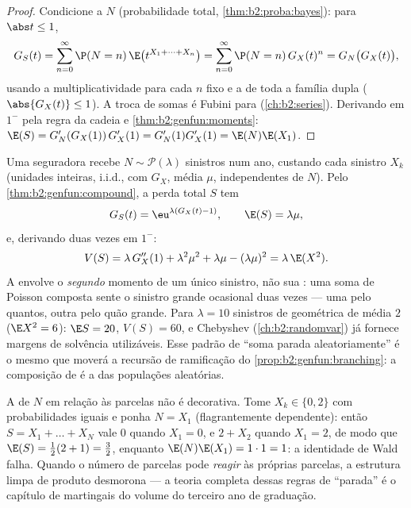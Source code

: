 \begin{proof}
Condicione a $N$ (probabilidade total,
\cref{thm:b2:proba:bayes}): para $\abs t \leq 1$,
\[
G_S(t) = \sum_{n=0}^\infty \P(N = n)\,
\E\bigl(t^{X_1 + \dots + X_n}\bigr)
= \sum_{n=0}^\infty \P(N = n)\,G_X(t)^n
= G_N\bigl(G_X(t)\bigr),
\]
usando a multiplicatividade para cada $n$ fixo e a  de
toda a família dupla ($\abs{G_X(t)} \leq 1$). A troca de
somas é Fubini para 
(\cref{ch:b2:series}). Derivando em $1^-$ pela regra da cadeia
e \cref{thm:b2:genfun:moments}: $\E(S) = G_N'(G_X(1))\,G_X'(1)
= G_N'(1)G_X'(1) = \E(N)\E(X_1)$.
\end{proof}

\begin{example}\label{ex:b2:genfun:compoundpoisson}
Uma seguradora recebe $N \sim \mathcal P(\lambda)$ sinistros num
ano, custando cada sinistro $X_k$ (unidades inteiras, i.i.d., com 
$G_X$, média $\mu$, independentes de $N$). Pelo
\cref{thm:b2:genfun:compound}, a perda total $S$ tem
\[
G_S(t) = \eu^{\lambda(G_X(t) - 1)},
\qquad
\E(S) = \lambda\mu ,
\]
e, derivando duas vezes em $1^-$:
\[
V(S) = \lambda\,G_X''(1) + \lambda^2\mu^2 + \lambda\mu -
(\lambda\mu)^2 = \lambda\,\E(X^2) .
\]
A  envolve o \emph{segundo} momento de um único
sinistro, não sua : uma soma de Poisson composta sente o
sinistro grande ocasional duas vezes --- uma pelo quantos, outra
pelo quão grande. Para $\lambda = 10$ sinistros de  geométrica
de média $2$ ($\E X^2 = 6$): $\E S = 20$, $V(S) = 60$, e
Chebyshev (\cref{ch:b2:randomvar}) já fornece margens de
solvência utilizáveis. Esse padrão de ``soma parada aleatoriamente'' é o
mesmo que moverá a recursão de ramificação do
\cref{prop:b2:genfun:branching}: a composição de  é a  das populações aleatórias.
\end{example}

\begin{remark}
A  de $N$ em relação às parcelas não é decorativa.
Tome $X_k \in \{0, 2\}$ com probabilidades iguais e ponha $N =
X_1$ (flagrantemente dependente): então $S = X_1 + \dots + X_N$ vale
$0$ quando $X_1 = 0$, e $2 + X_2$ quando $X_1 = 2$, de modo que $\E(S) =
\frac12(2 + 1) = \frac32$, enquanto $\E(N)\E(X_1) = 1\cdot1 =
1$: a identidade de Wald falha. Quando o número de parcelas
pode \emph{reagir} às próprias parcelas, a estrutura limpa de
produto desmorona --- a teoria completa dessas regras de
``parada'' é o capítulo de martingais do volume do terceiro ano
de graduação.
\end{remark}

